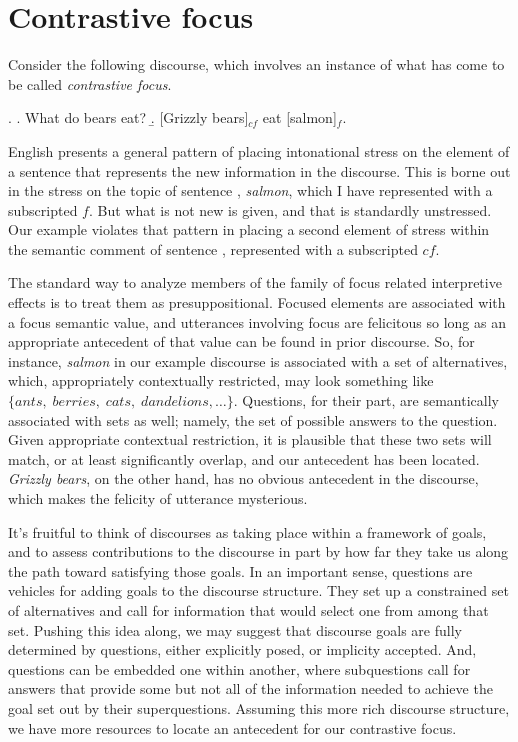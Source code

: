 \documentclass[letterpaper,10pt]{article}
\begin{document}
\section{Contrastive focus}

Consider the following discourse, which involves an instance of what has come to be called \textit{contrastive focus}.

\ex. \a. What do bears eat?
\b. [Grizzly bears]$_{cf}$ eat [salmon]$_{f}$.

English presents a general pattern of placing intonational stress on the element of a sentence that represents the new information in the discourse.  This is borne out in the stress on the topic of sentence \Last[b], \textit{salmon}, which I have represented with a subscripted $f$.  But what is not new is given, and that is standardly unstressed.  Our example violates that pattern in placing a second element of stress within the semantic comment of sentence \Last[b], represented with a subscripted $cf$.

The standard way to analyze members of the family of focus related interpretive effects is to treat them as presuppositional.  Focused elements are associated with a focus semantic value, and utterances involving focus are felicitous so long as an appropriate antecedent of that value can be found in prior discourse. So, for instance, \textit{salmon} in our example discourse is associated with a  set of alternatives, which, appropriately contextually restricted, may look something like $\{ants,\;berries,\;cats,\;dandelions,\ldots\}$.  Questions, for their part, are semantically associated with sets as well; namely, the set of possible answers to the question.  Given appropriate contextual restriction, it is plausible that these two sets will match, or at least significantly overlap, and our antecedent has been located.  \textit{Grizzly bears}, on the other hand, has no obvious antecedent in the discourse, which makes the felicity of utterance \Last[b] mysterious.

It's fruitful to think of discourses as taking place within a framework of goals, and to assess contributions to the discourse in part by how far they take us along the path toward satisfying those goals. In an important sense, questions are vehicles for adding goals to the discourse structure.  They set up a constrained set of alternatives and call for information that would select one from among that set. Pushing this idea along, we may suggest that discourse goals are fully determined by questions, either explicitly posed, or implicity accepted.  And, questions can be embedded one within another, where subquestions call for answers that provide some but not all of the information needed to achieve the goal set out by their superquestions. Assuming this more rich discourse structure, we have more resources to locate an antecedent for our contrastive focus.
\end{document}

